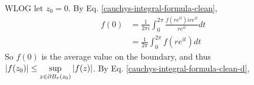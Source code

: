 \documentclass{homework}
\begin{document}
                                                                                                                                                                                                                                                   \begin{solution}
                                                                                                                                                                                                                                                   WLOG let $z_0=0.$ By Eq. \ref{cauchys-integral-formula-clean},
                                                                                                                                                                                                                                                   \begin{align*}
                                                                                                                                                                                                                                                   f(0) &= \frac{1}{2\pi i}\int_0^{2\pi} \frac{f(re^{it})ire^{it}}{re^{it}}dt\\
                                                                                                                                                                                                                                                   &= \frac{1}{2\pi}\int_0^{2\pi} f(re^{it}) dt
                                                                                                                                                                                                                                                   \end{align*}
                                                                                                                                                                                                                                                   So $f(0)$ is the average value on the boundary, and thus $\left|f(z_0)\right| \leq \displaystyle\sup_{z \in \partial B_r(z_0)} |f(z)|$.
                                                                                                                                                                                                                                                   By Eq. \ref{cauchys-integral-formula-clean-d},
                                                                                                                                                                                                                                                   \begin{align*}

\end{align*}
\end{solution}
\end{document}
